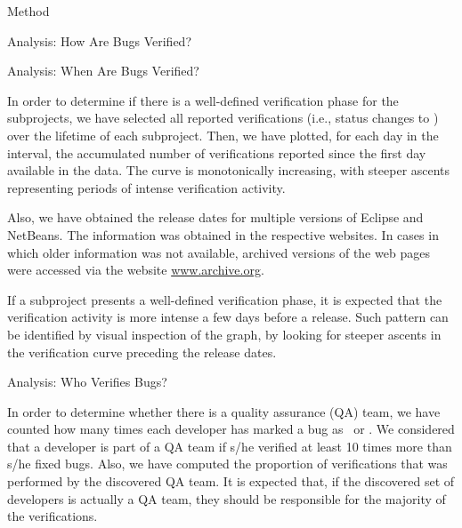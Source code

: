 \begin{section}{Method}
\begin{subsection}{Analysis: How Are Bugs Verified?}
\end{subsection}

\begin{subsection}{Analysis: When Are Bugs Verified?}
	
	In order to determine if there is a well-defined verification phase for the subprojects, we have selected all reported verifications (i.e., status changes to \VERIFIED) over the lifetime of each subproject. Then, we have plotted, for each day in the interval, the accumulated number of verifications reported since the first day available in the data. The curve is monotonically increasing, with steeper ascents representing periods of intense verification activity.
	
	Also, we have obtained the release dates for multiple versions of Eclipse and NetBeans. The information was obtained in the respective websites. In cases in which older information was not available, archived versions of the web pages were accessed via the website \url{www.archive.org}.
	
	If a subproject presents a well-defined verification phase, it is expected that the verification activity is more intense a few days before a release. Such pattern can be identified by visual inspection of the graph, by looking for steeper ascents in the verification curve preceding the release dates.
	
\end{subsection}

\begin{subsection}{Analysis: Who Verifies Bugs?}
	
	In order to determine whether there is a quality assurance (QA) team, we have counted how many times each developer has marked a bug as \FIXED\ or \VERIFIED. We considered that a developer is part of a QA team if s/he verified at least 10 times more than s/he fixed bugs. Also, we have computed the proportion of verifications that was performed by the discovered QA team. It is expected that, if the discovered set of developers is actually a QA team, they should be responsible for the majority of the verifications.
	
\end{subsection}

\end{section}

